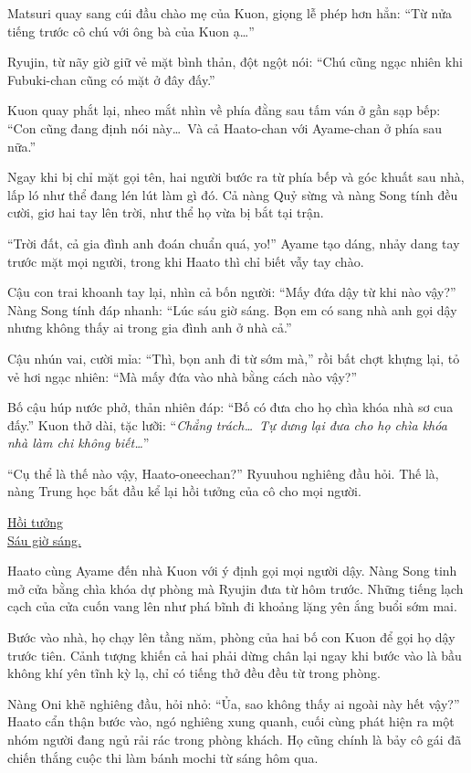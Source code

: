 \documentclass[../main.tex]{subfiles}
\begin{document}
Matsuri quay sang cúi đầu chào mẹ của Kuon, giọng lễ phép hơn hẳn: ``Từ nửa tiếng trước cô chú với ông bà của Kuon ạ\dots''

Ryujin, từ nãy giờ giữ vẻ mặt bình thản, đột ngột nói: ``Chú cũng ngạc nhiên khi Fubuki-chan cũng có mặt ở đây đấy.''

Kuon quay phắt lại, nheo mắt nhìn về phía đằng sau tấm ván ở gần sạp bếp: ``Con cũng đang định nói này\dots\ Và cả Haato-chan với Ayame-chan ở phía sau nữa.''

Ngay khi bị chỉ mặt gọi tên, hai người bước ra từ phía bếp và góc khuất sau nhà, lấp ló như thể đang lén lút làm gì đó. Cả nàng Quỷ sừng và nàng Song tính đều cười, giơ hai tay lên trời, như thể họ vừa bị bắt tại trận.

``Trời đất, cả gia đình anh đoán chuẩn quá, yo!'' Ayame tạo dáng, nhảy dang tay trước mặt mọi người, trong khi Haato thì chỉ biết vẫy tay chào.

Cậu con trai khoanh tay lại, nhìn cả bốn người: ``Mấy đứa dậy từ khi nào vậy?'' Nàng Song tính đáp nhanh: ``Lúc sáu giờ sáng. Bọn em có sang nhà anh gọi dậy nhưng không thấy ai trong gia đình anh ở nhà cả.''

Cậu nhún vai, cười mỉa: ``Thì, bọn anh đi từ sớm mà,'' rồi bất chợt khựng lại, tỏ vẻ hơi ngạc nhiên: ``Mà mấy đứa vào nhà bằng cách nào vậy?''

Bố cậu húp nước phở, thản nhiên đáp: ``Bố có đưa cho họ chìa khóa nhà sơ cua đấy.'' Kuon thở dài, tặc lưỡi: ``\textit{Chẳng trách\dots\ Tự dưng lại đưa cho họ chìa khóa nhà làm chi không biết\dots}''

``Cụ thể là thế nào vậy, Haato-oneechan?'' Ryuuhou nghiêng đầu hỏi. Thế là, nàng Trung học bắt đầu kể lại hồi tưởng của cô cho mọi người.

\begin{center}
    \uline{Hồi tưởng\\Sáu giờ sáng.}
\end{center}

Haato cùng Ayame đến nhà Kuon với ý định gọi mọi người dậy. Nàng Song tinh mở cửa bằng chìa khóa dự phòng mà Ryujin đưa từ hôm trước. Những tiếng lạch cạch của cửa cuốn vang lên như phá bĩnh đi khoảng lặng yên ắng buổi sớm mai.

Bước vào nhà, họ chạy lên tầng năm, phòng của hai bố con Kuon để gọi họ dậy trước tiên. Cảnh tượng khiến cả hai phải dừng chân lại ngay khi bước vào là bầu không khí yên tĩnh kỳ lạ, chỉ có tiếng thở đều đều từ trong phòng.

Nàng Oni khẽ nghiêng đầu, hỏi nhỏ: ``Ủa, sao không thấy ai ngoài này hết vậy?'' Haato cẩn thận bước vào, ngó nghiêng xung quanh, cuối cùng phát hiện ra một nhóm người đang ngủ rải rác trong phòng khách. Họ cũng chính là bảy cô gái đã chiến thắng cuộc thi làm bánh mochi từ sáng hôm qua.
\end{document}
